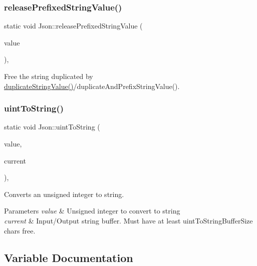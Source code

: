 \subsubsection{\texorpdfstring{release\+Prefixed\+String\+Value()}{releasePrefixedStringValue()}}
{\footnotesize\ttfamily static void Json\+::release\+Prefixed\+String\+Value (\begin{DoxyParamCaption}\item[{char $\ast$}]{value }\end{DoxyParamCaption})\hspace{0.3cm}{\ttfamily [inline]}, {\ttfamily [static]}}

Free the string duplicated by \hyperlink{namespaceJson_a678ac3a60cd70ec0fb4c9abfd40eb0c4}{duplicate\+String\+Value()}/duplicate\+And\+Prefix\+String\+Value(). \mbox{\label{namespaceJson_ac1ffd21a9e55122014353c773ccc496e}} 
\subsubsection{\texorpdfstring{uint\+To\+String()}{uintToString()}}
{\footnotesize\ttfamily static void Json\+::uint\+To\+String (\begin{DoxyParamCaption}\item[{Largest\+U\+Int}]{value,  }\item[{char $\ast$\&}]{current }\end{DoxyParamCaption})\hspace{0.3cm}{\ttfamily [inline]}, {\ttfamily [static]}}

Converts an unsigned integer to string. 
\begin{DoxyParams}{Parameters}
{\em value} & Unsigned integer to convert to string \\
\hline
{\em current} & Input/\+Output string buffer. Must have at least uint\+To\+String\+Buffer\+Size chars free. \\
\hline
\end{DoxyParams}


\subsection{Variable Documentation}
\mbox{\label{namespaceJson_a05aed54518637ec00aac59b03eb855a1}} 

